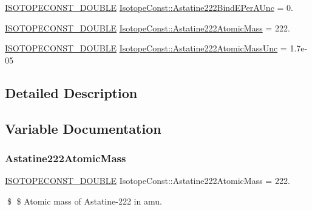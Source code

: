 \begin{DoxyCompactItemize}
\mbox{\hyperlink{group___isotope_const-_macros_ga8f45a7272ce02c0b4c65c44636ed719a}{I\+S\+O\+T\+O\+P\+E\+C\+O\+N\+S\+T\+\_\+\+D\+O\+U\+B\+LE}} \mbox{\hyperlink{group___isotope_const-_astatine-_at222_ga59adcca17aca935d4f04ef2403372b6d}{Isotope\+Const\+::\+Astatine222\+Bind\+E\+Per\+A\+Unc}} = 0.
\item 
\mbox{\hyperlink{group___isotope_const-_macros_ga8f45a7272ce02c0b4c65c44636ed719a}{I\+S\+O\+T\+O\+P\+E\+C\+O\+N\+S\+T\+\_\+\+D\+O\+U\+B\+LE}} \mbox{\hyperlink{group___isotope_const-_astatine-_at222_ga4a3605fee3a356577babf1467d170b45}{Isotope\+Const\+::\+Astatine222\+Atomic\+Mass}} = 222.
\item 
\mbox{\hyperlink{group___isotope_const-_macros_ga8f45a7272ce02c0b4c65c44636ed719a}{I\+S\+O\+T\+O\+P\+E\+C\+O\+N\+S\+T\+\_\+\+D\+O\+U\+B\+LE}} \mbox{\hyperlink{group___isotope_const-_astatine-_at222_ga72b9010ef598656d0052c096b2fa5ff0}{Isotope\+Const\+::\+Astatine222\+Atomic\+Mass\+Unc}} = 1.\+7e-\/05
\end{DoxyCompactItemize}


\subsection{Detailed Description}


\subsection{Variable Documentation}
\mbox{\label{group___isotope_const-_astatine-_at222_ga4a3605fee3a356577babf1467d170b45}} 
\subsubsection{\texorpdfstring{Astatine222\+Atomic\+Mass}{Astatine222AtomicMass}}
{\footnotesize\ttfamily \mbox{\hyperlink{group___isotope_const-_macros_ga8f45a7272ce02c0b4c65c44636ed719a}{I\+S\+O\+T\+O\+P\+E\+C\+O\+N\+S\+T\+\_\+\+D\+O\+U\+B\+LE}} Isotope\+Const\+::\+Astatine222\+Atomic\+Mass = 222.}

\$ \$ Atomic mass of Astatine-\/222 in amu. \mbox{\label{group___isotope_const-_astatine-_at222_ga72b9010ef598656d0052c096b2fa5ff0}} 
